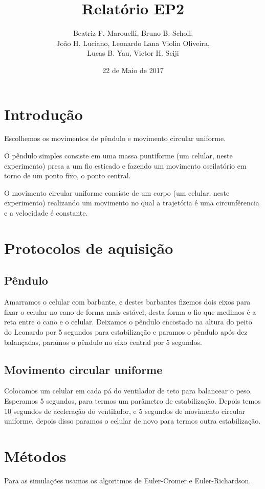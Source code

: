 \documentclass[a4paper, 12pt]{article}
\title{Relatório EP2}
\author{Beatriz F. Marouelli, Bruno B. Scholl, \\
        João H. Luciano, Leonardo Lana Violin Oliveira, \\ 
        Lucas B. Yau, Victor H. Seiji}
\date{22 de Maio de 2017}
\begin{document}
\maketitle

\section*{Introdução}
Escolhemos os movimentos de pêndulo e movimento circular uniforme. 

O pêndulo simples consiste em uma massa puntiforme (um celular, 
neste experimento) presa a um fio esticado e fazendo um movimento 
oscilatório em torno de um ponto fixo, o ponto central.

O movimento circular uniforme consiste de um corpo (um celular, 
neste experimento) realizando um movimento no qual a trajetória 
é uma circunfêrencia e a velocidade é constante.

\section*{Protocolos de aquisição}

\subsection*{Pêndulo}
Amarramos o celular com barbante, e destes barbantes fizemos dois 
eixos para fixar o celular no cano de forma mais estável, desta 
forma o fio que medimos é a reta entre o cano e o celular. Deixamos 
o pêndulo encostado na altura do peito do Leonardo por 5 segundos 
para estabilização e paramos o pêndulo após dez balançadas, paramos 
o pêndulo no eixo central por 5 segundos.

\subsection*{Movimento circular uniforme}
Colocamos um celular em cada pá do ventilador de teto para balancear 
o peso. Esperamos 5 segundos, para termos um parâmetro de estabilização. 
Depois temos 10 segundos de aceleração do ventilador, e 5 segundos de 
movimento circular uniforme, depois disso paramos o celular de novo 
para termos outra estabilização.

\section*{Métodos}
Para as simulações usamos os algoritmos de Euler-Cromer e Euler-Richardson.
\end{document}
